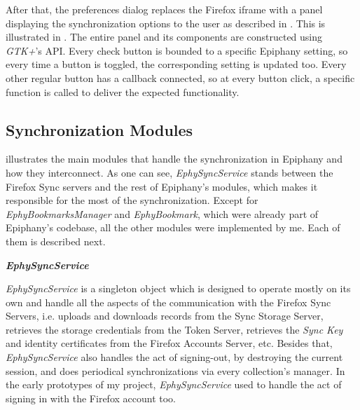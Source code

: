 After that, the preferences dialog replaces the Firefox iframe with a panel displaying the synchronization options to the user as described in . This is illustrated in . The entire panel and its components are constructed using \textit{GTK+}'s API. Every check button is bounded to a specific Epiphany setting, so every time a button is toggled, the corresponding setting is updated too. Every other regular button has a callback connected, so at every button click, a specific function is called to deliver the expected functionality.

\subsection{Synchronization Modules}
\label{sub-sec:synchronization-modules}

 illustrates the main modules that handle the synchronization in Epiphany and how they interconnect. As one can see, \textit{EphySyncService} stands between the Firefox Sync servers and the rest of Epiphany's modules, which makes it responsible for the most of the synchronization. Except for \textit{EphyBookmarksManager} and \textit{EphyBookmark}, which were already part of Epiphany's codebase, all the other modules were implemented by me. Each of them is described next.


\textbf{\textit{EphySyncService}}

\textit{EphySyncService} is a singleton object which is designed to operate mostly on its own and handle all the aspects of the communication with the Firefox Sync Servers, i.e. uploads and downloads records from the Sync Storage Server, retrieves the storage credentials from the Token Server, retrieves the \textit{Sync Key} and identity certificates from the Firefox Accounts Server, etc. Besides that, \textit{EphySyncService} also handles the act of signing-out, by destroying the current session, and does periodical synchronizations via every collection's manager. In the early prototypes of my project, \textit{EphySyncService} used to handle the act of signing in with the Firefox account too.

